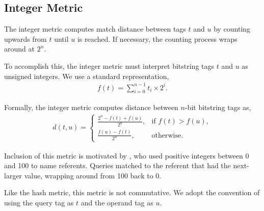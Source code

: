 \subsection{Integer Metric} \label{sec:integer}

The integer metric computes match distance between tags $t$ and $u$ by counting upwards from $t$ until $u$ is reached.
If necessary, the counting process wraps around at $2^n$.

To accomplish this, the integer metric must interpret bitstring tags $t$ and $u$ as unsigned integers.
We use a standard representation,
\begin{align*}
f(t)
= \sum_{i=0}^{n-1} t_i \times 2^i.
\end{align*}

Formally, the integer metric computes distance between $n$-bit bitstring tags as,
\begin{align*}
d(t, u) =
\begin{cases}
  \frac{2^n - f(t) + f(u)}{2^n}, & \text{if } f(t) > f(u), \\
  \frac{f(u) - f(t)}{2^n},         & \text{otherwise}.
\end{cases}
\end{align*}

Inclusion of this metric is motivated by \cite{spector2011tag}, who used positive integers between 0 and 100 to name referents.
Queries matched to the referent that had the next-larger value, wrapping around from 100 back to 0.

Like the hash metric, this metric is not commutative.
We adopt the convention of using the query tag as $t$ and the operand tag as $u$.
